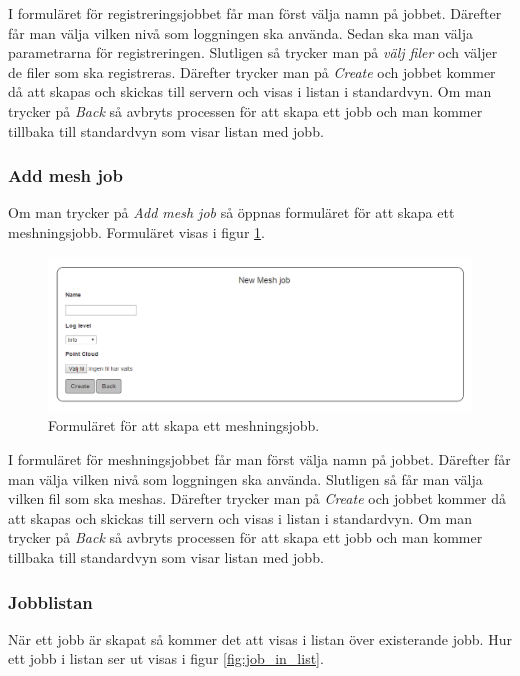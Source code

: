 \documentclass[a4paper,titlepage,12pt]{article}
\begin{document}
	I formuläret för registreringsjobbet får man först välja namn på jobbet. Därefter får man välja vilken nivå som loggningen ska använda. Sedan ska man välja parametrarna för registreringen. Slutligen så trycker man på \textit{välj filer} och väljer de filer som ska registreras. Därefter trycker man på \textit{Create} och jobbet kommer då att skapas och skickas till servern och visas i listan i standardvyn. Om man trycker på \textit{Back} så avbryts processen för att skapa ett jobb och man kommer tillbaka till standardvyn som visar listan med jobb.
	
	\subsubsection{Add mesh job}
	
	Om man trycker på \textit{Add mesh job} så öppnas formuläret för att skapa ett meshningsjobb. Formuläret visas i figur \ref{fig:mesh_job_form}.
	
	\begin{figure}[H]
		\centering
		\includegraphics[width=160mm]{images/mesh_job_form.PNG}
		\caption{Formuläret för att skapa ett meshningsjobb.}
		\label{fig:mesh_job_form}
	\end{figure}

	I formuläret för meshningsjobbet får man först välja namn på jobbet. Därefter får man välja vilken nivå som loggningen ska använda. Slutligen så får man välja vilken fil som ska meshas. Därefter trycker man på \textit{Create} och jobbet kommer då att skapas och skickas till servern och visas i listan i standardvyn. Om man trycker på \textit{Back} så avbryts processen för att skapa ett jobb och man kommer tillbaka till standardvyn som visar listan med jobb.
	
	\subsubsection{Jobblistan}
	
	När ett jobb är skapat så kommer det att visas i listan över existerande jobb. Hur ett jobb i listan ser ut visas i figur \ref{fig:job_in_list}.
	
\end{document}
